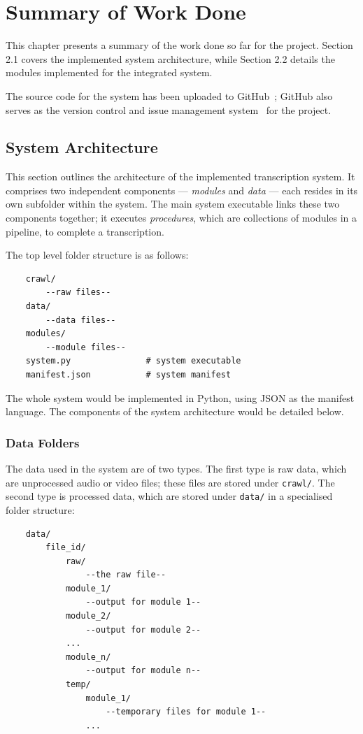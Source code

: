 \chapter{Summary of Work Done}

This chapter presents a summary of the work done so far for the project.
Section 2.1 covers the implemented system architecture, while Section 2.2
details the modules implemented for the integrated system.

The source code for the system has been uploaded to GitHub~\cite{gh-magor};
GitHub also serves as the version control and issue management
system~\cite{gh-magor-is} for the project.

\section{System Architecture}

This section outlines the architecture of the implemented transcription system.
 It comprises two independent components --- \textit{modules} and \textit{data} 
--- each resides in its own subfolder within the system. The main system 
executable links these two components together; it executes \textit{procedures},
which are collections of modules in a pipeline, to complete a transcription.

The top level folder structure is as follows:

\begin{lstlisting}
    crawl/
        --raw files--
    data/
        --data files--
    modules/
        --module files--
    system.py               # system executable
    manifest.json           # system manifest
\end{lstlisting}

The whole system would be implemented in Python, using JSON as the manifest
language. The components of the system architecture would be detailed below.

\subsection{Data Folders}

The data used in the system are of two types. The first type is raw data, 
which are unprocessed audio or video files; these files are stored under
\texttt{crawl/}. The second type is processed data, which are stored under
\texttt{data/} in a specialised folder structure:

\begin{lstlisting}
    data/
        file_id/
            raw/
                --the raw file--
            module_1/
                --output for module 1--
            module_2/
                --output for module 2--
            ...
            module_n/
                --output for module n--
            temp/
                module_1/
                    --temporary files for module 1--
                ...
\end{lstlisting}

